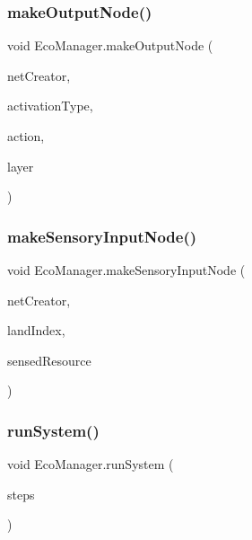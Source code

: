 \mbox{\label{class_eco_manager_a4d84a2362550dc39724e36df7d30ad06}} 
\subsubsection{\texorpdfstring{make\+Output\+Node()}{makeOutputNode()}}
{\footnotesize\ttfamily void Eco\+Manager.\+make\+Output\+Node (\begin{DoxyParamCaption}\item[{\mbox{\hyperlink{class_network_editor}{Network\+Editor}}}]{net\+Creator,  }\item[{\mbox{\hyperlink{_non_input_node_8cs_a832a6943e91e304dea9608c4ae2818e7}{Activation\+Behavior\+Types}}}]{activation\+Type,  }\item[{string}]{action,  }\item[{int}]{layer }\end{DoxyParamCaption})}

\mbox{\label{class_eco_manager_a7f08416b1570f58d235093da6d2c2129}} 
\subsubsection{\texorpdfstring{make\+Sensory\+Input\+Node()}{makeSensoryInputNode()}}
{\footnotesize\ttfamily void Eco\+Manager.\+make\+Sensory\+Input\+Node (\begin{DoxyParamCaption}\item[{\mbox{\hyperlink{class_network_editor}{Network\+Editor}}}]{net\+Creator,  }\item[{int}]{land\+Index,  }\item[{string}]{sensed\+Resource }\end{DoxyParamCaption})}

\mbox{\label{class_eco_manager_a83ca906cad37e9a2c6e41bc58e638e2e}} 
\subsubsection{\texorpdfstring{run\+System()}{runSystem()}}
{\footnotesize\ttfamily void Eco\+Manager.\+run\+System (\begin{DoxyParamCaption}\item[{int}]{steps }\end{DoxyParamCaption})}

